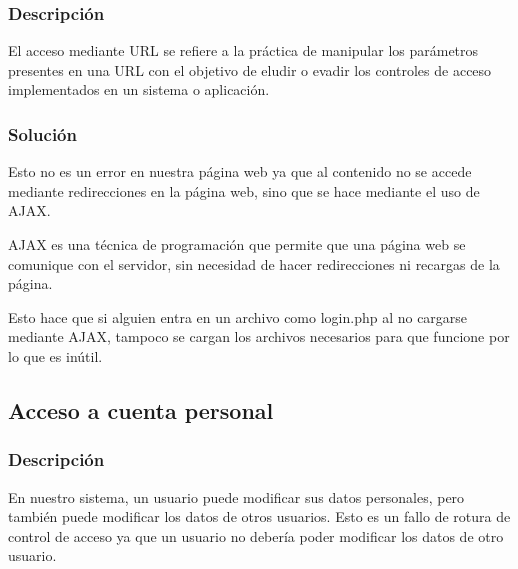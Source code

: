 \documentclass{report}
\begin{document}
                \subsubsection{Descripción}
                    El acceso mediante URL se refiere a la práctica de manipular los parámetros presentes en una URL con el objetivo de eludir o evadir los controles de acceso implementados en un sistema o aplicación. 
                \subsubsection{Solución}
                    Esto no es un error en nuestra página web ya que al contenido no se accede mediante redirecciones en la página web, sino que se hace mediante el uso de AJAX.
                    
                    AJAX es una técnica de programación que permite que una página web se comunique con el servidor, sin necesidad de hacer redirecciones ni recargas de la página.
                    
                    Esto hace que si alguien entra en un archivo como login.php al no cargarse mediante AJAX, tampoco se cargan los archivos necesarios para que funcione por lo que es inútil.
                \clearpage
            \subsection{Acceso a cuenta personal}
                \subsubsection{Descripción}
                    En nuestro sistema, un usuario puede modificar sus datos personales, pero también puede modificar los datos de otros usuarios. 
                    Esto es un fallo de rotura de control de acceso ya que un usuario no debería poder modificar los datos de otro usuario.
\end{document}

